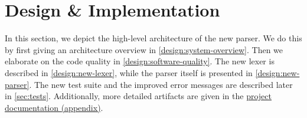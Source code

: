 
\section{Design \& Implementation}
\label{sec:design-implementation} 
In this section, we depict the high-level architecture of the new parser.
We do this by first giving an architecture overview in \autoref{design:system-overview}.
Then we elaborate on the code quality in \autoref{design:software-quality}.
The new lexer is described in \autoref{design:new-lexer}, while the parser itself is presented in \autoref{design:new-parser}.
The new test suite and the improved error messages are described later in \autoref{sec:tests}.
Additionally, more detailed artifacts are given in the \hyperref[app:docs]{project documentation (appendix)}.





